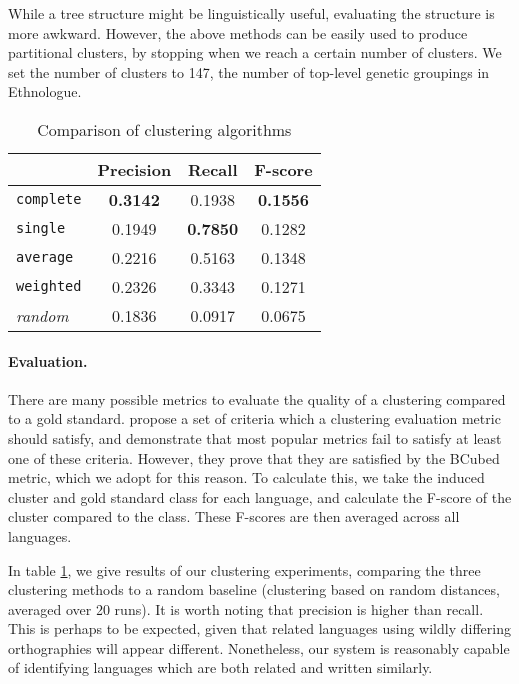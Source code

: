 While a tree structure might be linguistically useful, evaluating the structure is more awkward. However, the above methods can be easily used to produce partitional clusters, by stopping when we reach a certain number of clusters. We set the number of clusters to 147, the number of top-level genetic groupings in Ethnologue.

\begin{table}[t]
\begin{centering}

    \begin{tabular}{l|ccc}
    ~        & Precision & Recall       & F-score    \\ \hline
	\texttt{complete} & \textbf{0.3142}	& 0.1938	 & \textbf{0.1556} \\
	\texttt{single} & 0.1949	& \textbf{0.7850}	 & 0.1282 \\
	\texttt{average} & 0.2216	& 0.5163	& 0.1348 \\
	\texttt{weighted} & 0.2326	& 0.3343	& 0.1271 \\ \hline
	\emph{random} & 0.1836	& 0.0917	& 0.0675 \\
    \end{tabular}
\caption{Comparison of clustering algorithms}
\label{table:cluster}
\end{centering}
\end{table}

\paragraph{Evaluation.}
There are many possible metrics to evaluate the quality of a clustering compared to a gold standard. 
 propose a set of criteria which a clustering evaluation metric should satisfy, and demonstrate that most popular metrics fail to satisfy at least one of these criteria.  However, they prove that they are satisfied by the BCubed metric, which we adopt for this reason.  To calculate this, we take the induced cluster and gold standard class for each language, and calculate the F-score of the cluster compared to the class.  These F-scores are then averaged across all languages.

In table \ref{table:cluster}, we give results of our clustering experiments, comparing the three clustering methods to a random baseline (clustering based on random distances, averaged over 20 runs).  It is worth noting that precision is higher than recall.  This is perhaps to be expected, given that related languages using wildly differing orthographies will appear different.  Nonetheless, our system is reasonably capable of identifying languages which are both related and written similarly.

